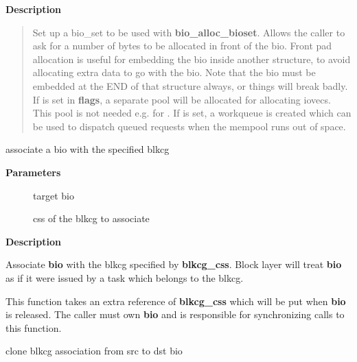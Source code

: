 \documentclass[a4paper,8pt,english]{sphinxmanual}
\begin{document}
\textbf{Description}
\begin{quote}

Set up a bio\_set to be used with \textbf{bio\_alloc\_bioset}. Allows the caller
to ask for a number of bytes to be allocated in front of the bio.
Front pad allocation is useful for embedding the bio inside
another structure, to avoid allocating extra data to go with the bio.
Note that the bio must be embedded at the END of that structure always,
or things will break badly.
If  is set in \textbf{flags}, a separate pool will be allocated
for allocating iovecs.  This pool is not needed e.g. for {\hyperref[filesystems/index:c.bio_clone_fast]{\emph{}}}.
If  is set, a workqueue is created which can be used to
dispatch queued requests when the mempool runs out of space.
\end{quote}

\begin{fulllineitems}
\label{filesystems/index:c.bio_associate_blkcg}
associate a bio with the specified blkcg

\end{fulllineitems}


\textbf{Parameters}
\begin{description}
\item[{}] \leavevmode
target bio

\item[{}] \leavevmode
css of the blkcg to associate

\end{description}

\textbf{Description}

Associate \textbf{bio} with the blkcg specified by \textbf{blkcg\_css}.  Block layer will
treat \textbf{bio} as if it were issued by a task which belongs to the blkcg.

This function takes an extra reference of \textbf{blkcg\_css} which will be put
when \textbf{bio} is released.  The caller must own \textbf{bio} and is responsible for
synchronizing calls to this function.

\begin{fulllineitems}
\label{filesystems/index:c.bio_clone_blkcg_association}
clone blkcg association from src to dst bio

\end{fulllineitems}
\end{document}
